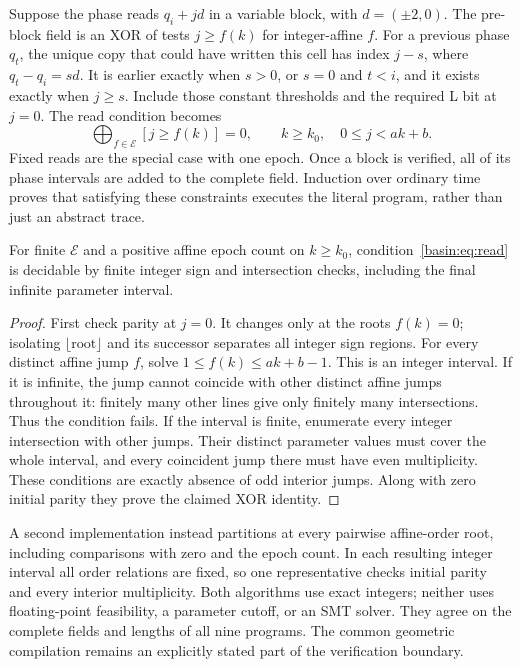 Suppose the phase reads $q_i+jd$ in a variable block, with $d=(\pm2,0)$.
The pre-block field is an XOR of tests $j\ge f(k)$ for integer-affine $f$.
For a previous phase $q_t$, the unique copy that could have written this cell
has index $j-s$, where $q_t-q_i=sd$. It is earlier exactly when
$s>0$, or $s=0$ and $t<i$, and it exists exactly when $j\ge s$.
Include those constant thresholds and the required L bit at $j=0$. The read
condition becomes
\begin{equation}
 \bigoplus_{f\in\mathcal E}[j\ge f(k)]=0,
 \qquad k\ge k_0,\quad 0\le j<ak+b.                     \label{basin:eq:read}
\end{equation}
Fixed reads are the special case with one epoch. Once a block is verified,
all of its phase intervals are added to the complete field. Induction over
ordinary time proves that satisfying these constraints executes the literal
program, rather than just an abstract trace.

\begin{lemma}\label{basin:lem:affine}
For finite $\mathcal E$ and a positive affine epoch count on $k\ge k_0$,
condition~\eqref{basin:eq:read} is decidable by finite integer sign and intersection
checks, including the final infinite parameter interval.
\end{lemma}
\begin{proof}
First check parity at $j=0$. It changes only at the roots $f(k)=0$; isolating
$\lfloor\text{root}\rfloor$ and its successor separates all integer sign regions.
For every distinct affine jump $f$, solve
$1\le f(k)\le ak+b-1$. This is an integer interval. If it is infinite, the
jump cannot coincide with other distinct affine jumps throughout it: finitely
many other lines give only finitely many intersections. Thus the condition
fails. If the interval is finite, enumerate every integer intersection with
other jumps. Their distinct parameter values must cover the whole interval,
and every coincident jump there must have even multiplicity. These conditions
are exactly absence of odd interior jumps. Along with zero initial parity they
prove the claimed XOR identity.
\end{proof}

A second implementation instead partitions at every pairwise affine-order
root, including comparisons with zero and the epoch count. In each resulting
integer interval all order relations are fixed, so one representative checks
initial parity and every interior multiplicity. Both algorithms use exact
integers; neither uses floating-point feasibility, a parameter cutoff, or an
SMT solver. They agree on the complete fields and lengths of all nine programs.
The common geometric compilation remains an explicitly stated part of the
verification boundary.

